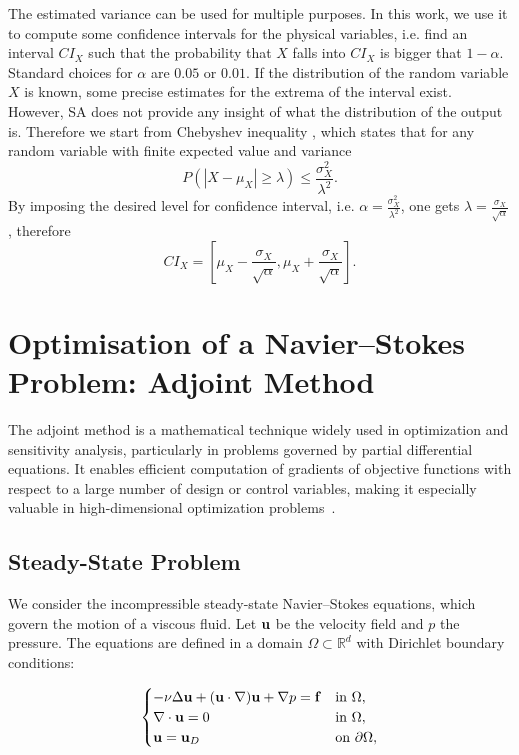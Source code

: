 The estimated variance can be used for multiple purposes. In this work, we use it to compute some confidence intervals for the physical variables, i.e. find an interval $CI_X$ such that the probability that $X$ falls into $CI_X$ is bigger that $1-\alpha$. Standard choices for $\alpha$ are $0.05$ or $0.01$. If the distribution of the random variable $X$ is known, some precise estimates for the extrema of the interval exist. However, SA does not provide any insight of what the distribution of the output is. Therefore we start from Chebyshev inequality \cite{jacod2012probability}, which states that for any random variable with finite expected value and variance
\[
P(|X-\mu_X| \geq \lambda) \leq \frac{\sigma^2_X}{\lambda^2}.
\]
By imposing the desired level for confidence interval, i.e. $\alpha = \frac{\sigma^2_X}{\lambda^2}$, one gets $\lambda = \frac{\sigma_X}{\sqrt{\alpha}}$, therefore
\begin{equation}
CI_X = \left[\mu_X - \frac{\sigma_X}{\sqrt{\alpha}}, \mu_X + \frac{\sigma_X}{\sqrt{\alpha}}\right].
\label{CI}
\end{equation}


\chapter{Optimisation of a Navier–Stokes Problem: Adjoint Method}
\label{sec_adjoint}

The adjoint method is a mathematical technique widely used in optimization and sensitivity analysis, particularly in problems governed by partial differential equations. It enables efficient computation of gradients of objective functions with respect to a large number of design or control variables, making it especially valuable in high-dimensional optimization problems~\cite{giles2000introduction}.

\section{Steady-State Problem}

We consider the incompressible steady-state Navier–Stokes equations, which govern the motion of a viscous fluid. Let $\b_u$ be the velocity field and $p$ the pressure. The equations are defined in a domain $\Omega \subset \mathbb{R}^d$ with Dirichlet boundary conditions:

\begin{equation}
\begin{cases}
- \nu \Delta \b_u + (\b_u \cdot \nabla) \b_u + \nabla p = \mathbf{f} & \text{in } \Omega, \\
\nabla \cdot \b_u = 0 & \text{in } \Omega, \\
\b_u = \b_u_D & \text{on } \partial \Omega,
\end{cases}
\label{state}
\end{equation}


